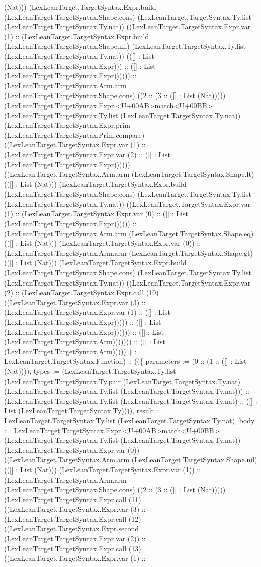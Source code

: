 \documentclass[11pt]{article}
\begin{document}
(Nat))) (LexLeanTarget.TargetSyntax.Expr.build (LexLeanTarget.TargetSyntax.Shape.cons) (LexLeanTarget.TargetSyntax.Ty.list (LexLeanTarget.TargetSyntax.Ty.nat)) ((LexLeanTarget.TargetSyntax.Expr.var (1) :: (LexLeanTarget.TargetSyntax.Expr.build (LexLeanTarget.TargetSyntax.Shape.nil) (LexLeanTarget.TargetSyntax.Ty.list (LexLeanTarget.TargetSyntax.Ty.nat)) (([] : List (LexLeanTarget.TargetSyntax.Expr))) :: ([] : List (LexLeanTarget.TargetSyntax.Expr)))))) :: (LexLeanTarget.TargetSyntax.Arm.arm (LexLeanTarget.TargetSyntax.Shape.cons) ((2 :: (3 :: ([] : List (Nat))))) (LexLeanTarget.TargetSyntax.Expr.<U+00AB>match<U+00BB> (LexLeanTarget.TargetSyntax.Ty.list (LexLeanTarget.TargetSyntax.Ty.nat)) (LexLeanTarget.TargetSyntax.Expr.prim (LexLeanTarget.TargetSyntax.Prim.compare) ((LexLeanTarget.TargetSyntax.Expr.var (1) :: (LexLeanTarget.TargetSyntax.Expr.var (2) :: ([] : List (LexLeanTarget.TargetSyntax.Expr)))))) ((LexLeanTarget.TargetSyntax.Arm.arm (LexLeanTarget.TargetSyntax.Shape.lt) (([] : List (Nat))) (LexLeanTarget.TargetSyntax.Expr.build (LexLeanTarget.TargetSyntax.Shape.cons) (LexLeanTarget.TargetSyntax.Ty.list (LexLeanTarget.TargetSyntax.Ty.nat)) ((LexLeanTarget.TargetSyntax.Expr.var (1) :: (LexLeanTarget.TargetSyntax.Expr.var (0) :: ([] : List (LexLeanTarget.TargetSyntax.Expr)))))) :: (LexLeanTarget.TargetSyntax.Arm.arm (LexLeanTarget.TargetSyntax.Shape.eq) (([] : List (Nat))) (LexLeanTarget.TargetSyntax.Expr.var (0)) :: (LexLeanTarget.TargetSyntax.Arm.arm (LexLeanTarget.TargetSyntax.Shape.gt) (([] : List (Nat))) (LexLeanTarget.TargetSyntax.Expr.build (LexLeanTarget.TargetSyntax.Shape.cons) (LexLeanTarget.TargetSyntax.Ty.list (LexLeanTarget.TargetSyntax.Ty.nat)) ((LexLeanTarget.TargetSyntax.Expr.var (2) :: (LexLeanTarget.TargetSyntax.Expr.call (10) ((LexLeanTarget.TargetSyntax.Expr.var (3) :: (LexLeanTarget.TargetSyntax.Expr.var (1) :: ([] : List (LexLeanTarget.TargetSyntax.Expr))))) :: ([] : List (LexLeanTarget.TargetSyntax.Expr)))))) :: ([] : List (LexLeanTarget.TargetSyntax.Arm))))))) :: ([] : List (LexLeanTarget.TargetSyntax.Arm))))) \} : LexLeanTarget.TargetSyntax.Function) :: ((\{ parameters := (0 :: (1 :: ([] : List (Nat)))), types := (LexLeanTarget.TargetSyntax.Ty.list (LexLeanTarget.TargetSyntax.Ty.pair (LexLeanTarget.TargetSyntax.Ty.nat) (LexLeanTarget.TargetSyntax.Ty.list (LexLeanTarget.TargetSyntax.Ty.nat))) :: (LexLeanTarget.TargetSyntax.Ty.list (LexLeanTarget.TargetSyntax.Ty.nat) :: ([] : List (LexLeanTarget.TargetSyntax.Ty)))), result := LexLeanTarget.TargetSyntax.Ty.list (LexLeanTarget.TargetSyntax.Ty.nat), body := LexLeanTarget.TargetSyntax.Expr.<U+00AB>match<U+00BB> (LexLeanTarget.TargetSyntax.Ty.list (LexLeanTarget.TargetSyntax.Ty.nat)) (LexLeanTarget.TargetSyntax.Expr.var (0)) ((LexLeanTarget.TargetSyntax.Arm.arm (LexLeanTarget.TargetSyntax.Shape.nil) (([] : List (Nat))) (LexLeanTarget.TargetSyntax.Expr.var (1)) :: (LexLeanTarget.TargetSyntax.Arm.arm (LexLeanTarget.TargetSyntax.Shape.cons) ((2 :: (3 :: ([] : List (Nat))))) (LexLeanTarget.TargetSyntax.Expr.call (11) ((LexLeanTarget.TargetSyntax.Expr.var (3) :: (LexLeanTarget.TargetSyntax.Expr.call (12) ((LexLeanTarget.TargetSyntax.Expr.second (LexLeanTarget.TargetSyntax.Expr.var (2)) :: (LexLeanTarget.TargetSyntax.Expr.call (13) ((LexLeanTarget.TargetSyntax.Expr.var (1) :: 
\end{document}
